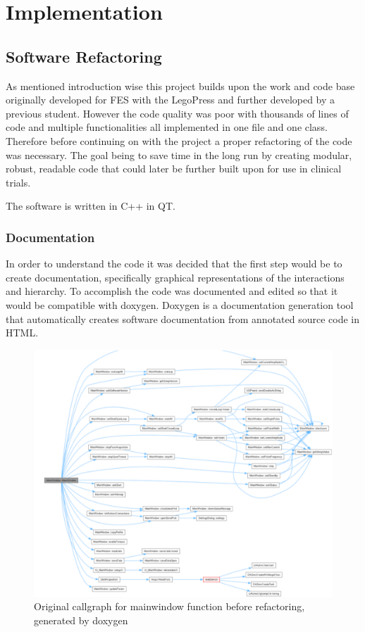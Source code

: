 
\section{Implementation}
\subsection{Software Refactoring}
As mentioned introduction wise this project builds upon the work and code base originally developed for FES with the LegoPress \cite{olivier_legopress_2014} and further developed by a previous student. However the code quality was poor with thousands of lines of code and multiple functionalities all implemented in one file and one class. Therefore before continuing on with the project a proper refactoring of the code was necessary. The goal being to save time in the long run by creating modular, robust, readable code that could later be further built upon for use in clinical trials.

The software is written in C++ in QT.

\subsubsection{Documentation}

In order to understand the code it was decided that the first step would be to create documentation, specifically graphical representations of the interactions and hierarchy. To accomplish the code was documented and edited so that it would be compatible with doxygen. Doxygen is a documentation generation tool that automatically creates software documentation from annotated source code in HTML.

\begin{figure} [H]
    \centering
    \includegraphics[width=0.9\linewidth]{images/oldDoxy.png}
    \caption{Original callgraph for mainwindow function before refactoring, generated by doxygen}
    \label{fig:oldDoxy}
\end{figure}

